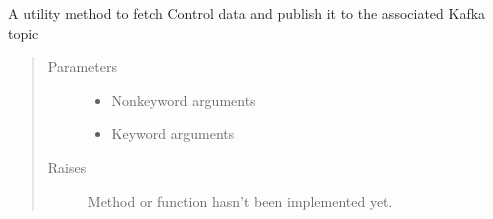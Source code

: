 \documentclass[letterpaper,10pt,english]{sphinxmanual}
\begin{document}

\begin{fulllineitems}
\label{\detokenize{Forge:Forge.ctrl_fetch_publish}}
\sphinxAtStartPar
A utility method to fetch Control data and publish it to the associated Kafka topic
\begin{quote}\begin{description}
\item[{Parameters}] \leavevmode\begin{itemize}
\item {} 
\sphinxAtStartPar
{} \textendash{} Non\sphinxhyphen{}keyword arguments

\item {} 
\sphinxAtStartPar
{} \textendash{} Keyword arguments

\end{itemize}

\item[{Raises}] \leavevmode
\sphinxAtStartPar
{} \textendash{} Method or function hasn’t been implemented yet.

\end{description}\end{quote}

\end{fulllineitems}

\end{document}
